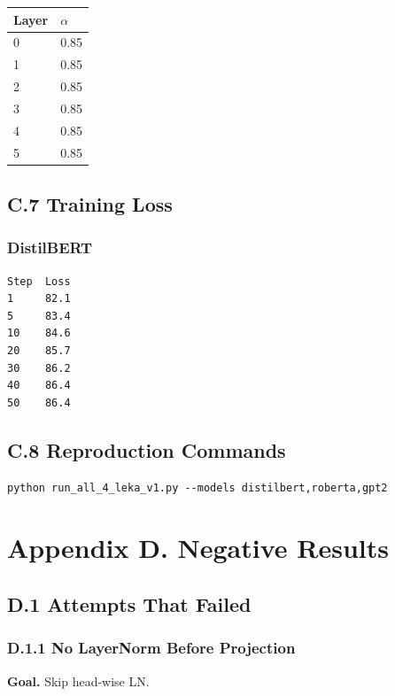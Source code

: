\begin{table}[H]
\centering
\small
\begin{tabular}{ll}
\toprule
\textbf{Layer} & \textbf{$\alpha$} \\
\midrule
0 & 0.85 \\
1 & 0.85 \\
2 & 0.85 \\
3 & 0.85 \\
4 & 0.85 \\
5 & 0.85 \\
\bottomrule
\end{tabular}
\end{table}

\subsection{C.7 Training Loss}

\subsubsection{DistilBERT}
\begin{lstlisting}
Step  Loss
1     82.1
5     83.4
10    84.6
20    85.7
30    86.2
40    86.4
50    86.4
\end{lstlisting}

\subsection{C.8 Reproduction Commands}

\begin{lstlisting}
python run_all_4_leka_v1.py --models distilbert,roberta,gpt2
\end{lstlisting}



\section{Appendix D. Negative Results}

\subsection{D.1 Attempts That Failed}

\subsubsection{D.1.1 No LayerNorm Before Projection}

\textbf{Goal.} Skip head-wise LN.

